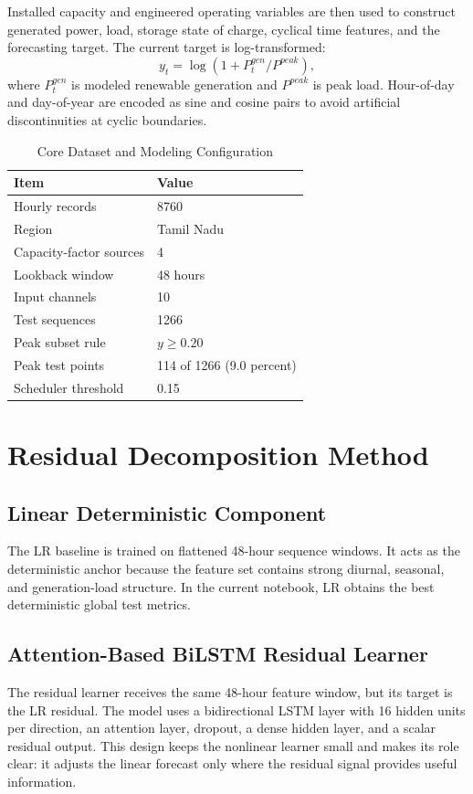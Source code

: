 \documentclass[journal]{IEEEtran}
\begin{document}
Installed capacity and engineered operating variables are then used to construct generated power, load, storage state of charge, cyclical time features, and the forecasting target. The current target is log-transformed:
\begin{equation}
y_t = \log(1 + P^{gen}_t / P^{peak}),
\end{equation}
where $P^{gen}_t$ is modeled renewable generation and $P^{peak}$ is peak load. Hour-of-day and day-of-year are encoded as sine and cosine pairs to avoid artificial discontinuities at cyclic boundaries.

\begin{table}[!t]
\caption{Core Dataset and Modeling Configuration}
\label{tab:data_config}
\centering
\begin{tabular}{ll}
\toprule
Item & Value \\
\midrule
Hourly records & 8760 \\
Region & Tamil Nadu \\
Capacity-factor sources & 4 \\
Lookback window & 48 hours \\
Input channels & 10 \\
Test sequences & 1266 \\
Peak subset rule & $y \ge 0.20$ \\
Peak test points & 114 of 1266 (9.0 percent) \\
Scheduler threshold & 0.15 \\
\bottomrule
\end{tabular}
\end{table}

\section{Residual Decomposition Method}
\subsection{Linear Deterministic Component}
The LR baseline is trained on flattened 48-hour sequence windows. It acts as the deterministic anchor because the feature set contains strong diurnal, seasonal, and generation-load structure. In the current notebook, LR obtains the best deterministic global test metrics.

\subsection{Attention-Based BiLSTM Residual Learner}
The residual learner receives the same 48-hour feature window, but its target is the LR residual. The model uses a bidirectional LSTM layer with 16 hidden units per direction, an attention layer, dropout, a dense hidden layer, and a scalar residual output. This design keeps the nonlinear learner small and makes its role clear: it adjusts the linear forecast only where the residual signal provides useful information.
\end{document}
